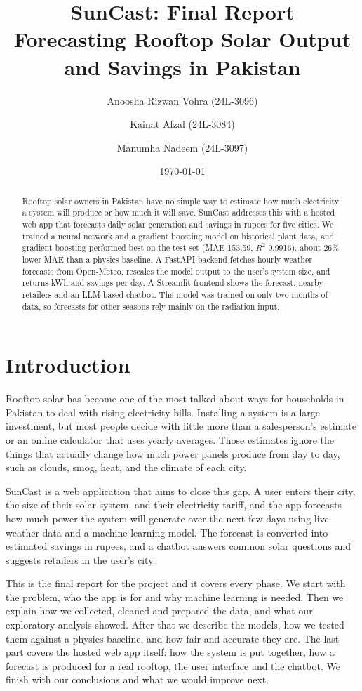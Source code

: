 \documentclass[11pt,a4paper]{article}
\title{SunCast: Final Report\\
\large Forecasting Rooftop Solar Output and Savings in Pakistan}
\author{Anoosha Rizwan Vohra (24L-3096) \and Kainat Afzal (24L-3084) \and Manumha Nadeem (24L-3097)}
\date{\today}
\begin{document}
\maketitle

\begin{abstract}
Rooftop solar owners in Pakistan have no simple way to estimate how much
electricity a system will produce or how much it will save. SunCast addresses
this with a hosted web app that forecasts daily solar generation and savings
in rupees for five cities. We trained a neural network and a gradient
boosting model on historical plant data, and gradient boosting performed best
on the test set (MAE 153.59, $R^2$ 0.9916), about 26\% lower MAE than a
physics baseline. A FastAPI backend fetches hourly weather forecasts from
Open-Meteo, rescales the model output to the user's system size, and returns
kWh and savings per day. A Streamlit frontend shows the forecast, nearby
retailers and an LLM-based chatbot. The model was trained on only two months
of data, so forecasts for other seasons rely mainly on the radiation input.
\end{abstract}

\tableofcontents
\newpage

\section{Introduction}
Rooftop solar has become one of the most talked about ways for households in Pakistan to deal with rising electricity bills. Installing a system is a large investment, but most people decide with little more than a salesperson's estimate or an online calculator that uses yearly averages. Those estimates ignore the things that actually change how much power panels produce from day to day, such as clouds, smog, heat, and the climate of each city.
 
 SunCast is a web application that aims to close this gap. A user enters their city, the size of their solar system, and their electricity tariff, and the app forecasts how much power the system will generate over the next few days using live weather data and a machine learning model. The forecast is converted into estimated savings in rupees, and a chatbot answers common solar questions and suggests retailers in the user's city.
 
This is the final report for the project and it covers every phase. We start with the problem, who the app is for and why machine learning is needed. Then we explain how we collected, cleaned and prepared the data, and what our exploratory analysis showed. After that we describe the models, how we tested them against a physics baseline, and how fair and accurate they are. The last part covers the hosted web app itself: how the system is put together, how a forecast is produced for a real rooftop, the user interface and the chatbot. We finish with our conclusions and what we would improve next.
 
\end{document}
